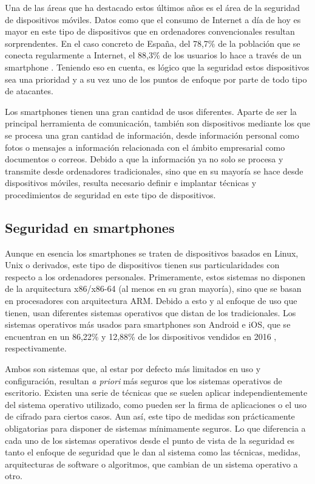 Una de las áreas que ha destacado estos últimos años es el área de la seguridad de dispositivos móviles. Datos como que el consumo de Internet a día de hoy es mayor en este tipo de dispositivos que en ordenadores convencionales resultan sorprendentes. En el caso concreto de España, del 78,7\% de la población que se conecta regularmente a Internet, el 88,3\% de los usuarios lo hace a través de un smartphone \cite{smartphones-internet}. Teniendo eso en cuenta, es lógico que la seguridad estos dispositivos sea una prioridad y a su vez uno de los puntos de enfoque por parte de todo tipo de atacantes.

Los smartphones tienen una gran cantidad de usos diferentes. Aparte de ser la principal herramienta de comunicación, también son dispositivos mediante los que se procesa una gran cantidad de información, desde información personal como fotos o mensajes a información relacionada con el ámbito empresarial como documentos o correos. Debido a que la información ya no solo se procesa y transmite desde ordenadores tradicionales, sino que en su mayoría se hace desde dispositivos móviles, resulta necesario definir e implantar técnicas y procedimientos de seguridad en este tipo de dispositivos.

\subsection{Seguridad en smartphones}

Aunque en esencia los smartphones se traten de dispositivos basados en Linux, Unix o derivados, este tipo de dispositivos tienen sus particularidades con respecto a los ordenadores personales. Primeramente, estos sistemas no disponen de la arquitectura x86/x86-64 (al menos en su gran mayoría), sino que se basan en procesadores con arquitectura ARM. Debido a esto y al enfoque de uso que tienen, usan diferentes sistemas operativos que distan de los tradicionales. Los sistemas operativos más usados para smartphones son Android e iOS, que se encuentran en un 86,22\% y 12,88\% de los dispositivos vendidos en 2016 \cite{gartner-uso-so}, respectivamente.

Ambos son sistemas que, al estar por defecto más limitados en uso y configuración, resultan \textit{a priori} más seguros que los sistemas operativos de escritorio. Existen una serie de técnicas que se suelen aplicar independientemente del sistema operativo utilizado, como pueden ser la firma de aplicaciones o el uso de cifrado para ciertos casos. Aun así, este tipo de medidas son prácticamente obligatorias para disponer de sistemas mínimamente seguros. Lo que diferencia a cada uno de los sistemas operativos desde el punto de vista de la seguridad es tanto el enfoque de seguridad que le dan al sistema como las técnicas, medidas, arquitecturas de software o algoritmos, que cambian de un sistema operativo a otro.


